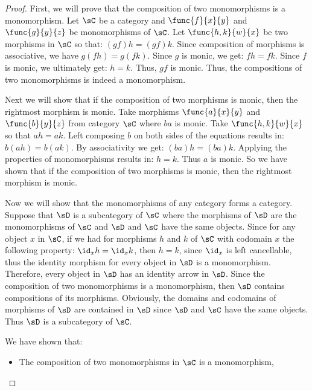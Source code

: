 \documentclass[../../main]{subfiles}
\begin{document}
\begin{proof}
	First, we will prove that the composition of two monomorphisms is a
	monomorphism. Let \(\sC\) be a category and \(\func{f}{x}{y}\) and
	\(\func{g}{y}{z}\) be monomorphisms of \(\sC\). Let \(\func{h,k}{w}{x}\) be
	two morphisms in \(\sC\) so that: \((gf)h=(gf)k\). Since composition of
	morphisms is associative, we have \(g(fh)=g(fk)\). Since \(g\) is monic, we
	get: \(fh=fk.\) Since \(f\) is monic, we ultimately get: \(h=k.\) Thus,
	\(gf\) is monic. Thus, the compositions of two monomorphisms is indeed a
	monomorphism.

	Next we will show that if the composition of two morphisms is monic, then
	the rightmost morphism is monic. Take morphisms \(\func{a}{x}{y}\) and
	\(\func{b}{y}{z}\) from category \(\sC\) where \(ba\) is monic. Take
	\(\func{h,k}{w}{x}\) so that \(ah=ak\). Left composing \(b\) on both sides
	of the equations results in: \(b(ah)=b(ak)\). By associativity we get:
	\((ba)h=(ba)k\). Applying the properties of monomorphisms results in:
	\(h=k\). Thus \(a\) is monic. So we have shown that if the composition of two
	morphisms is monic, then the rightmost morphism is monic.

	Now we will show that the monomorphisms of any category forms a category.
	Suppose that \(\sD\) is a subcategory of \(\sC\) where the morphisms of
	\(\sD\) are the monomorphisms of \(\sC\) and \(\sD\) and \(\sC\) have the
	same objects. Since for any object \(x\) in \(\sC\), if we had for morphisms
	\(h\) and \(k\) of \(\sC\) with codomain \(x\) the following property:
	\(\id_{x}h=\id_{x}k\), then \(h=k\), since \(\id_{x}\) is left cancellable,
	thus the identity morphism for every object in \(\sD\) is a monomorphism.
	Therefore, every object in \(\sD\) has an identity arrow in \(\sD\). Since
	the composition of two monomorphisms is a monomorphism, then \(\sD\)
	contains compositions of its morphisms. Obviously, the domains and codomains
	of morphisms of \(\sD\) are contained in \(\sD\) since \(\sD\) and \(\sC\)
	have the same objects. Thus \(\sD\) is a subcategory of \(\sC\).

	We have shown that:
	\begin{itemize}
		\item The composition of two monomorphisms in \(\sC\) is a monomorphism,


\end{itemize}
\end{proof}
\end{document}
